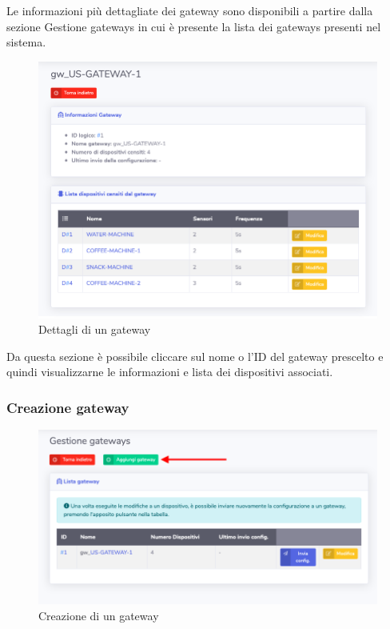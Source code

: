 		Le informazioni più dettagliate dei gateway sono disponibili a partire dalla sezione Gestione gateways in cui è presente la lista dei gateways presenti nel sistema.

		\begin{figure}[H]
		\centering
		\includegraphics[scale=0.600]{res/images/admin/dettGateway.png}
		\caption{Dettagli di un gateway}
	\end{figure}

		Da questa sezione è possibile cliccare sul nome o l'ID del gateway prescelto e quindi visualizzarne le informazioni e lista dei dispositivi associati.

	\subsubsection{Creazione gateway}

		\begin{figure}[H]
		\centering
		\includegraphics[scale=0.600]{res/images/admin/selCreazGateway.png}
		\caption{Creazione di un gateway}
	\end{figure}



